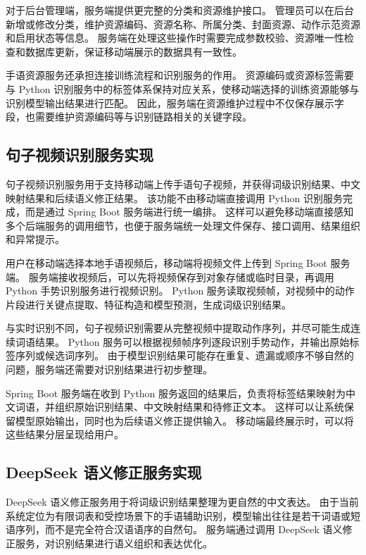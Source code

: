 对于后台管理端，服务端提供更完整的分类和资源维护接口。
管理员可以在后台新增或修改分类，维护资源编码、资源名称、所属分类、封面资源、动作示范资源和启用状态等信息。
服务端在处理这些操作时需要完成参数校验、资源唯一性检查和数据库更新，保证移动端展示的数据具有一致性。

手语资源服务还承担连接训练流程和识别服务的作用。
资源编码或资源标签需要与 Python 识别服务中的标签体系保持对应关系，使移动端选择的训练资源能够与识别模型输出结果进行匹配。
因此，服务端在资源维护过程中不仅保存展示字段，也需要维护资源编码等与识别链路相关的关键字段。

\subsection{句子视频识别服务实现}

句子视频识别服务用于支持移动端上传手语句子视频，并获得词级识别结果、中文映射结果和后续语义修正结果。
该功能不由移动端直接调用 Python 识别服务完成，而是通过 Spring Boot 服务端进行统一编排。
这样可以避免移动端直接感知多个后端服务的调用细节，也便于服务端统一处理文件保存、接口调用、结果组织和异常提示。

用户在移动端选择本地手语视频后，移动端将视频文件上传到 Spring Boot 服务端。
服务端接收视频后，可以先将视频保存到对象存储或临时目录，再调用 Python 手势识别服务进行视频识别。
Python 服务读取视频帧，对视频中的动作片段进行关键点提取、特征构造和模型预测，生成词级识别结果。

与实时识别不同，句子视频识别需要从完整视频中提取动作序列，并尽可能生成连续词语结果。
Python 服务可以根据视频帧序列逐段识别手势动作，并输出原始标签序列或候选词序列。
由于模型识别结果可能存在重复、遗漏或顺序不够自然的问题，服务端还需要对识别结果进行初步整理。

Spring Boot 服务端在收到 Python 服务返回的结果后，负责将标签结果映射为中文词语，并组织原始识别结果、中文映射结果和待修正文本。
这样可以让系统保留模型原始输出，同时也为后续语义修正提供输入。
移动端最终展示时，可以将这些结果分层呈现给用户。

\subsection{DeepSeek 语义修正服务实现}

DeepSeek 语义修正服务用于将词级识别结果整理为更自然的中文表达。
由于当前系统定位为有限词表和受控场景下的手语辅助识别，模型输出往往是若干词语或短语序列，而不是完全符合汉语语序的自然句。
服务端通过调用 DeepSeek 语义修正服务，对识别结果进行语义组织和表达优化。

